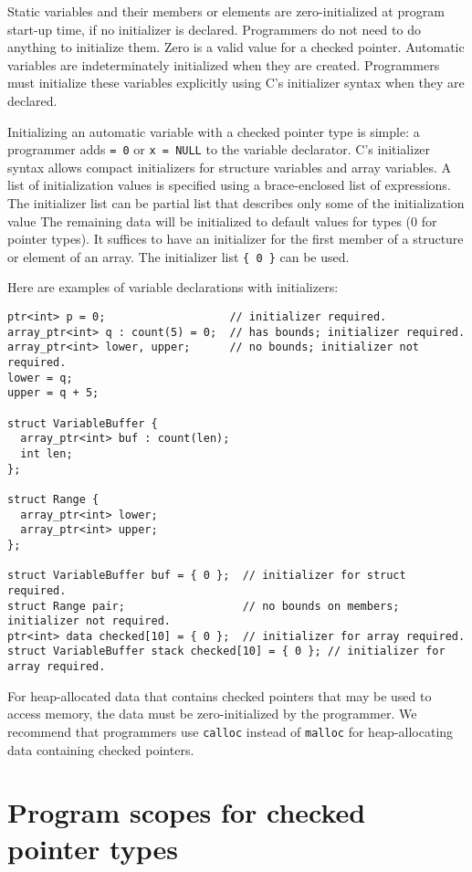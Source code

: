 Static variables and their members or elements are zero-initialized at program
start-up time, if no initializer is declared.  Programmers do not need to do anything to
initialize them.  Zero is a valid value for a checked pointer.
Automatic variables are indeterminately initialized when they are created.
Programmers must initialize these variables explicitly using C's initializer syntax
when they are declared.

Initializing an automatic variable with a checked pointer type is simple: a programmer adds
\lstinline+= 0+ or \lstinline+x = NULL+ to the variable declarator. C's initializer syntax
allows compact initializers for structure variables and array variables.
A list of initialization values is specified using a brace-enclosed list of expressions.
The initializer list can be partial list that describes
only some of the initialization value  The remaining data will be initialized to default values
for types (0 for pointer types). It suffices to have an initializer for the first member
of a structure or element of an array. The initializer list \lstinline+{ 0 }+ can be used.

Here are examples of variable declarations with initializers:
\begin{lstlisting}
ptr<int> p = 0;                   // initializer required.
array_ptr<int> q : count(5) = 0;  // has bounds; initializer required.
array_ptr<int> lower, upper;      // no bounds; initializer not required.
lower = q;
upper = q + 5;

struct VariableBuffer {
  array_ptr<int> buf : count(len);
  int len;
};

struct Range {
  array_ptr<int> lower;
  array_ptr<int> upper;
};

struct VariableBuffer buf = { 0 };  // initializer for struct required.
struct Range pair;                  // no bounds on members; initializer not required.
ptr<int> data checked[10] = { 0 };  // initializer for array required.
struct VariableBuffer stack checked[10] = { 0 }; // initializer for array required.
\end{lstlisting}

For heap-allocated data that contains checked pointers that may be used to access memory, the
data must be zero-initialized by the programmer.  We recommend that programmers use
\lstinline+calloc+ instead of \lstinline+malloc+ for heap-allocating data containing checked pointers.

\section{Program scopes for checked pointer types}


